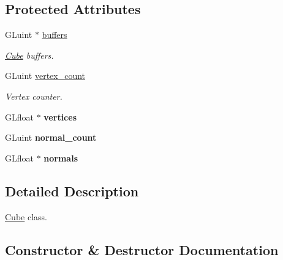 \subsection*{Protected Attributes}
\begin{DoxyCompactItemize}
\item 
\mbox{\label{classCube_a338392f0debc019f35b253973f09ff7d}} 
G\+Luint $\ast$ \mbox{\hyperlink{classCube_a338392f0debc019f35b253973f09ff7d}{buffers}}
\begin{DoxyCompactList}\small\item\em \mbox{\hyperlink{classCube}{Cube}} buffers. \end{DoxyCompactList}\item 
\mbox{\label{classCube_a07d7c382528186d13d22737146097ee5}} 
G\+Luint \mbox{\hyperlink{classCube_a07d7c382528186d13d22737146097ee5}{vertex\+\_\+count}}
\begin{DoxyCompactList}\small\item\em Vertex counter. \end{DoxyCompactList}\item 
\mbox{\label{classCube_a2f94e67fce8e82c2cbf0a613ddcec83b}} 
G\+Lfloat $\ast$ {\bfseries vertices}
\item 
\mbox{\label{classCube_a8449f5165f68ae174b87c8d1f95fdc7e}} 
G\+Luint {\bfseries normal\+\_\+count}
\item 
\mbox{\label{classCube_a5d56935a4fb818f1396266e85374870f}} 
G\+Lfloat $\ast$ {\bfseries normals}
\end{DoxyCompactItemize}


\subsection{Detailed Description}
\mbox{\hyperlink{classCube}{Cube}} class. 



\subsection{Constructor \& Destructor Documentation}
\mbox{\label{classCube_a06f3d86fb63e3aad08623610aa3c17b4}} 
